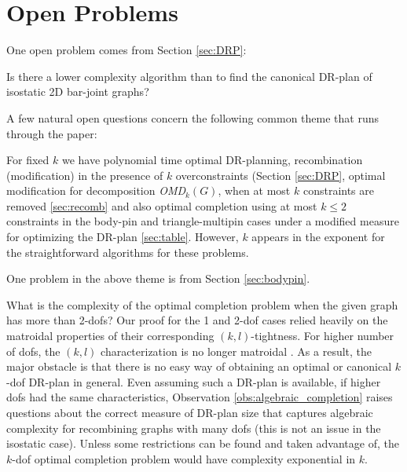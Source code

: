 \section{Open Problems}
\label{sec:appendix:b}

\label{sec:futurework}

One open problem comes from Section \ref{sec:DRP}:
\begin{openproblem}
    Is there a lower complexity algorithm than \candrpcomplexityv to find the canonical DR-plan of isostatic 2D bar-joint graphs?
\end{openproblem}


A few natural  open questions concern the following common theme that runs through the paper:

\begin{openproblem}
    For fixed $k$ we have polynomial time optimal DR-planning, recombination (modification) in the presence of $k$ overconstraints (Section \ref{sec:DRP}, optimal modification for decomposition {\sl OMD}$_k(G)$, when at most $k$ constraints are removed \ref{sec:recomb} and also optimal completion using at most $k\le 2$ constraints in the body-pin and triangle-multipin cases under a modified measure for optimizing the DR-plan \ref{sec:table}. However, $k$ appears in the exponent for the straightforward algorithms for these problems.
\end{openproblem}

One problem in the above theme is from Section \ref{sec:bodypin}.
\begin{openproblem}
    What is the complexity of the optimal completion problem when the given graph has more than 2-dofs? Our proof for the 1 and 2-dof cases relied heavily on the matroidal properties of their corresponding $(k,l)$-tightness. For higher number of dofs, the $(k,l)$ characterization is no longer matroidal \cite{Lee:2007:PGA}. As a result, the major obstacle is that there is no easy way of obtaining an optimal or canonical $k$-dof DR-plan in general. Even assuming such  a DR-plan is available, if higher dofs had the same characteristics, Observation \ref{obs:algebraic_completion} raises questions about the correct measure of DR-plan size that captures algebraic complexity for recombining graphs with many dofs (this is not an issue in the isostatic case). Unless some restrictions can be found and taken advantage of, the $k$-dof optimal completion problem would  have complexity exponential in $k$.
\end{openproblem}

